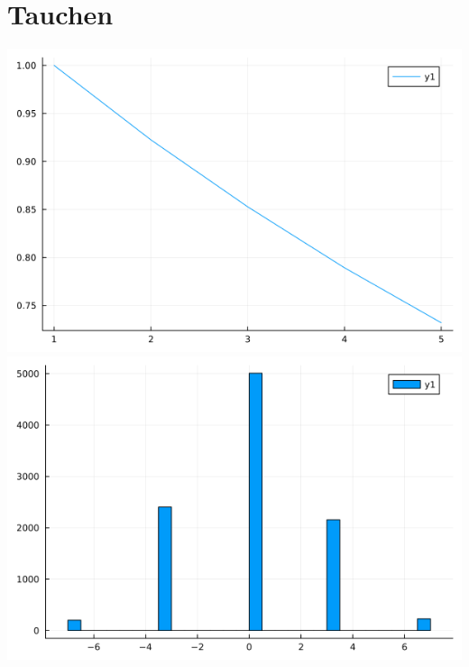 \documentclass{article}
\begin{document}
\section*{Tauchen}
\begin{center}
    \includegraphics[scale = 0.6]{p2.png} \\
    \includegraphics[scale = 0.6]{p7.png} \\


\end{center}
\end{document}
